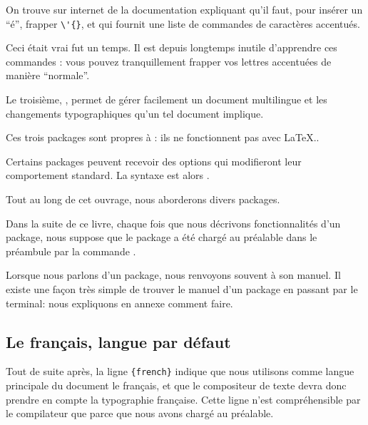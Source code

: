 \begin{plusloins}
On trouve sur internet de la documentation   expliquant qu'il faut,  pour insérer un \enquote{é},  frapper \verb|\'{}|, et qui fournit une liste de commandes de caractères accentués. 

Ceci était vrai fut un temps. Il est depuis longtemps inutile d'apprendre ces commandes : vous pouvez tranquillement frapper vos lettres accentuées de manière \enquote{normale}. 
\end{plusloins}

Le troisième, , permet de gérer facilement un document multilingue et les changements typographiques qu'un tel document implique.

Ces trois packages sont propres à \XeLaTeX  : ils ne fonctionnent pas avec \LaTeX..

Certains packages peuvent recevoir des options qui modifieront leur comportement standard. La syntaxe est alors .

Tout au long de cet ouvrage, nous aborderons divers packages.

\begin{attention}
Dans la suite de ce livre, chaque fois que nous décrivons fonctionnalités d'un package, nous suppose que  le package a été chargé au préalable dans le préambule par la commande .
\end{attention}

\begin{plusloins}
Lorsque nous parlons d'un package, nous renvoyons souvent à son manuel. Il existe une façon très simple de trouver le manuel d'un package en passant par le terminal: nous expliquons en annexe comment faire.
\end{plusloins}

\subsection{Le fran\c cais, langue par défaut\label{french}}

Tout de suite après, la ligne \verb|{french}| indique que nous utilisons comme langue principale du document le fran\c cais, et  que le compositeur de texte devra   donc prendre en compte la typographie fran\c caise. Cette ligne n'est compréhensible par le compilateur que parce que nous avons chargé  au préalable.

